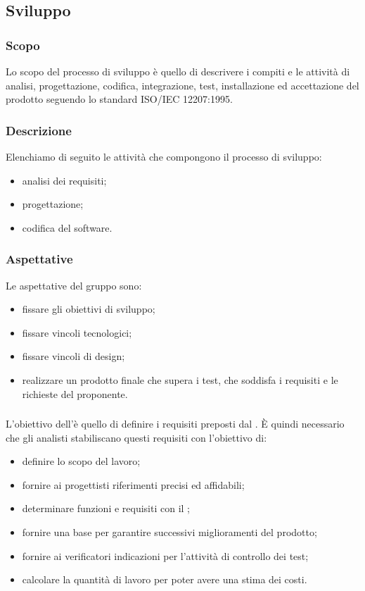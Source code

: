 \subsection{Sviluppo}
\subsubsection{Scopo}
Lo scopo del processo di sviluppo è quello di descrivere i compiti e le attività di analisi, progettazione, codifica, integrazione, test, installazione ed accettazione del prodotto seguendo lo standard ISO/IEC 12207:1995.

\subsubsection{Descrizione}
Elenchiamo di seguito le attività che compongono il processo di sviluppo:
\begin{itemize}
    \item analisi dei requisiti;
    \item progettazione;
    \item codifica del software.
\end{itemize}

\subsubsection{Aspettative}
Le aspettative del gruppo sono:
\begin{itemize}
    \item fissare gli obiettivi di sviluppo;
    \item fissare vincoli tecnologici;
    \item fissare vincoli di design;
    \item realizzare un prodotto finale che supera i test, che soddisfa i requisiti e le richieste del proponente.
\end{itemize}

\subsubsection{\AdR{}}
L'obiettivo dell'\AdRv{}è quello di definire i requisiti preposti dal \proponProg{}. È quindi necessario che gli analisti stabiliscano questi requisiti con l'obiettivo di:
\begin{itemize}
    \item definire lo scopo del lavoro;
    \item fornire ai progettisti riferimenti precisi ed affidabili;
    \item determinare funzioni e requisiti con il \proponProg;
    \item fornire una base per garantire successivi miglioramenti del prodotto;
    \item fornire ai verificatori indicazioni per l'attività di controllo dei test;
    \item calcolare la quantità di lavoro per poter avere una stima dei costi.
\end{itemize}







